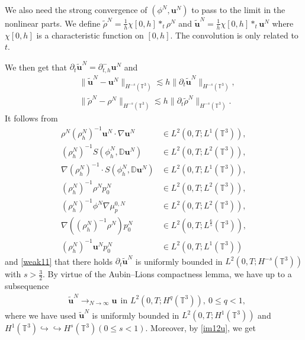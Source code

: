 \documentclass[reqno,a4paper,11pt]{amsart}
\theoremstyle{plain}
\numberwithin{equation}{section}
\begin{document}
We also need the strong convergence of $(\phi^{N},\mathbf{u}^{N})$ to pass to the limit in the nonlinear parts. We define
$\widetilde{\rho}^{N}=\frac{1}{h}\chi[0,h]\ast_{t} \rho^{N}$ and $\widetilde{\mathbf{u}}^{N}=\frac{1}{h}\chi[0,h]\ast_{t} \mathbf{u}^{N}$ where $\chi[0,h]$ is a characteristic function on $[0,h]$. The convolution is only related to $t$.

We then get that $\partial_{t}\widetilde{\mathbf{u}}^{N}=\partial_{t,h}^{-}\mathbf{u}^{N}$ and
\begin{align}\label{im12u}
	&\|\widetilde{\mathbf{u}}^{N}-\mathbf{u}^{N}\|_{H^{-s}(\mathbb{T}^{3})}\lesssim h\|\partial_{t}\widetilde{\mathbf{u}}^{N}\|_{H^{-s}(\mathbb{T}^{3})},
	\\&\label{im12rho}\|\widetilde{\rho}^{N}-\rho^{N}\|_{H^{-s}(\mathbb{T}^{3})}\lesssim h\|\partial_{t}\widetilde{\rho}^{N}\|_{H^{-s}(\mathbb{T}^{3})}.
\end{align}
It follows from
\begin{align*}
	\rho^{N}(\rho_{h}^{N})^{-1}\mathbf{u}^{N}\cdot\nabla \mathbf{u}^{N}& \in L^{2}(0,T;L^{1}(\mathbb{T}^{3})),
	\\  (\rho_{h}^{N})^{-1} S(\phi_{h}^{N},\mathbb{ D}\mathbf{u}^{N})&\in L^{2}(0,T;L^{2}(\mathbb{T}^{3})),
	\\\nabla (\rho_{h}^{N})^{-1}\cdot S(\phi_{h}^{N},\mathbb{ D}\mathbf{u}^{N})&\in L^{2}(0,T;L^{1}(\mathbb{T}^{3})),
	\\(\rho_{h}^{N})^{-1}\rho^{N}p_{0}^{N}&\in L^{2}(0,T;L^{2}(\mathbb{T}^{3})),
	\\(\rho_{h}^{N})^{-1}\phi^{N}\nabla\mu_{p}^{0,N}&\in L^{2}(0,T;L^{2}(\mathbb{T}^{3})),
	\\ \nabla((\rho_{h}^{N})^{-1} \rho^{N})p_{0}^{N}&\in L^{2}(0,T;L^{\frac{6}{5}}(\mathbb{T}^{3})),
	\\(\rho_{h}^{N})^{-1}\mathbf{u}^{N}p_{0}^{N}&\in L^{2}(0,T;L^{1}(\mathbb{T}^{3}))
\end{align*}
and \eqref{weak11} that there holds $\partial_{t}\widetilde{\mathbf{u}}^{N}$ is uniformly bounded in $L^{2}(0,T; H^{-s}(\mathbb{T}^{3}))$ with $s > \frac{3}{2}$. By virtue of the Aubin--Lions compactness lemma, we have up to a subsequence
\begin{align*}
	& \widetilde{\mathbf{u}}^{N}\rightarrow_{N\rightarrow\infty}\mathbf{u} \ \  \text{in  $L^{2}(0,T; H^{q}(\mathbb{T}^{3}))$},\ 0\leq q<1,
\end{align*}
where we have used $\widetilde{\mathbf{u}}^{N}$ is uniformly bounded in $L^{2}(0,T; H^{1}(\mathbb{T}^{3}))$ and $H^{1}(\mathbb{T}^{3})\hookrightarrow\hookrightarrow H^{s}(\mathbb{T}^{3})(0\leq s<1)$. Moreover, by \eqref{im12u}, we get
\end{document}
